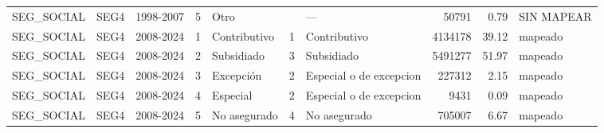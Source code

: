 \begin{tabular}{lllrlllrrl}
SEG\_SOCIAL & SEG4 & 1998-2007 & 5 & Otro &  & — & 50791 & 0.79 & SIN MAPEAR \\
SEG\_SOCIAL & SEG4 & 2008-2024 & 1 & Contributivo & 1 & Contributivo & 4134178 & 39.12 & mapeado \\
SEG\_SOCIAL & SEG4 & 2008-2024 & 2 & Subsidiado & 3 & Subsidiado & 5491277 & 51.97 & mapeado \\
SEG\_SOCIAL & SEG4 & 2008-2024 & 3 & Excepción & 2 & Especial o de excepcion & 227312 & 2.15 & mapeado \\
SEG\_SOCIAL & SEG4 & 2008-2024 & 4 & Especial & 2 & Especial o de excepcion & 9431 & 0.09 & mapeado \\
SEG\_SOCIAL & SEG4 & 2008-2024 & 5 & No asegurado & 4 & No asegurado & 705007 & 6.67 & mapeado \\
\bottomrule
\end{tabular}
